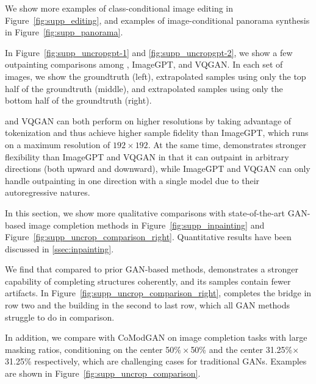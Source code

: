 We show more examples of class-conditional image editing in Figure~\ref{fig:supp_editing}, and examples of image-conditional panorama synthesis in Figure~\ref{fig:supp_panorama}. 

\label{sec:supp_outpainting_comparison_with_transformers}
In Figure~\ref{fig:supp_uncropgpt-1} and \ref{fig:supp_uncropgpt-2}, we show a few outpainting comparisons among \model, ImageGPT\cite{chen2020imagegpt}, and VQGAN\cite{Esser21vqgan}. In each set of images, we show the groundtruth (left), extrapolated samples using only the top half of the groundtruth (middle), and extrapolated samples using only the bottom half of the groundtruth (right). 

\model and VQGAN can both perform on higher resolutions by taking advantage of tokenization and thus achieve higher sample fidelity than ImageGPT, which runs on a maximum resolution of $192\times192$. At the same time, \model demonstrates stronger flexibility than ImageGPT and VQGAN in that it can outpaint in arbitrary directions (\eg both upward and downward), while ImageGPT and VQGAN can only handle outpainting in one direction with a single model due to their autoregressive natures.




\label{sec:supp_inpainting_and_outpainting_comparison_with_gans}

In this section, we show more qualitative comparisons with state-of-the-art GAN-based image completion methods in Figure~\ref{fig:supp_inpainting} and Figure~\ref{fig:supp_uncrop_comparison_right}. Quantitative results have been discussed in \ref{ssec:inpainting}. 

We find that compared to prior GAN-based methods, \model demonstrates a stronger capability of completing structures coherently, and its samples contain fewer artifacts. In Figure~\ref{fig:supp_uncrop_comparison_right}, \model completes the bridge in row two and the building in the second to last row, which all GAN methods struggle to do in comparison. 



In addition, we compare with CoModGAN on image completion tasks with large masking ratios, \ie conditioning on the center 50$\%\times$50\% and the center 31.25\%$\times$31.25\% respectively, which are challenging cases for traditional GANs. Examples are shown in Figure~\ref{fig:supp_uncrop_comparison}.

